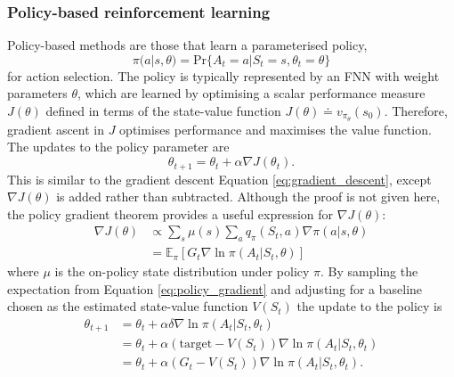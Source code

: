 \subsubsection{Policy-based reinforcement learning}
Policy-based methods are those that learn a parameterised policy, 
\begin{equation}
\pi(a|s,\theta) = \text{Pr}\{ A_t=a | S_t=s, \theta_t=\theta \}
\label{eq:policy_gradient_discrete_policy}
\end{equation}
for action selection. The policy is typically represented by an FNN with weight parameters $\theta$, which are learned by optimising a scalar performance measure $J(\theta)$ defined in terms of the state-value function $J(\theta) \doteq v_{\pi_\theta}(s_0)$. Therefore, gradient ascent in $J$ optimises performance and maximises the value function. The updates to the policy parameter are 
\begin{equation}
    \theta_{t+1} = \theta_t + \alpha  \nabla J(\theta_t).
    \label{eq:policy_update}
\end{equation}
This is similar to the gradient descent Equation \ref{eq:gradient_descent}, except $\nabla J(\theta)$ is added rather than subtracted.
Although the proof is not given here, the policy gradient theorem provides a useful expression for $\nabla J(\theta)$:
\begin{equation}
\begin{split}
    \nabla J(\theta) &\propto \sum_{s} \mu(s) \sum_{a} q_\pi(S_t, a) \nabla \pi (a | s, \theta) \\
    &= \mathbb{E}_\pi \left[ G_t   \nabla \ln \pi (A_t | S_t, \theta) \right]
    \label{eq:policy_gradient}
\end{split}
\end{equation}
where $\mu$ is the on-policy state distribution under policy $\pi$. By sampling the expectation from Equation \ref{eq:policy_gradient} and adjusting for a baseline chosen as the estimated state-value function $V(S_t)$ the update to the policy is 
\begin{equation}
\begin{split}
    \theta_{t+1} &= \theta_{t} + \alpha \delta \nabla \ln \pi(A_t | S_t, \theta_t) \\
    &= \theta_{t} + \alpha ( \text{target} - V(S_t) ) \nabla \ln \pi(A_t | S_t, \theta_t) \\
    &= \theta_{t} + \alpha ( G_t - V(S_t) ) \nabla \ln \pi(A_t | S_t, \theta_t).
    \label{eq:reinforce_update}
\end{split}
\end{equation}
